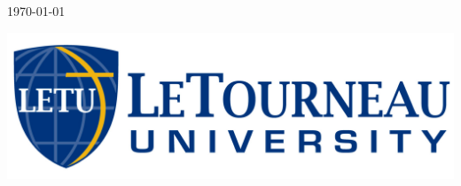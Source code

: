 \begin{titlepage}
{\Large \df\today}\\[2cm] %

\vfill %

\includegraphics[scale=0.20]{logoHoriz.jpg}\\[1cm] %


\end{titlepage}